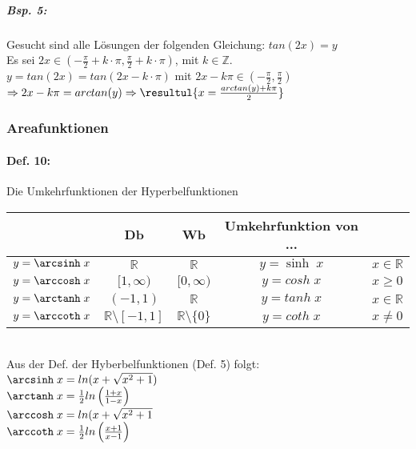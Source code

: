 \subparagraph{Bsp. 5:}\parskp
Gesucht sind alle Lösungen der folgenden Gleichung: $tan(2x)=y$\\
Es sei $2x \in \left( -\frac{\pi}{2}+k \cdot \pi, \frac{\pi}{2} + k \cdot \pi\right)$, mit $k \in \mathbb{Z}$.\\
$y=tan(2x)=tan(2x-k\cdot \pi)$ mit $2x-k\pi \in \left(-\frac{\pi}{2}, \frac{\pi}{2}\right)$\\
$\Rightarrow 2x - k \pi = arctan(y) \Rightarrow \resultul{x = \frac{arctan(y)+k\pi}{2}}$

\subsubsection{Areafunktionen}

\paragraph{Def. 10:} \parskp
Die Umkehrfunktionen der Hyperbelfunktionen\\
\begin{tabular}{c | c | c | c l}
 & Db & Wb & Umkehrfunktion von ...\\
\hline
$y=\arcsinh\; x$ & $\mathbb{R}$ & $\mathbb{R}$ & $y=\sinh\;x$ & $ x \in \mathbb{R}$\\
$y=\arccosh\; x $ & $[1,\infty)$ & $[0,\infty)$ & $y=cosh\; x$ & $x\geq 0$\\
$y=\arctanh\; x$ & $(-1,1)$ & $\mathbb{R}$ & $y=tanh \; x $ & $x \in \mathbb{R}$\\
$y=\arccoth\; x $ & $\mathbb{R}\setminus[-1,1]$ & $\mathbb{R}\setminus\{0\}$ & $y=coth\; x$ & $x \not = 0$\\
\end{tabular}\\
Aus der Def. der Hyberbelfunktionen (Def. 5) folgt:\\
$\arcsinh\; x = ln (x+\sqrt{x^2+1})$\\
$\arctanh\; x=\frac{1}{2}ln\left(\frac{1+x}{1-x}\right)$\\
$\arccosh\; x = ln (x+\sqrt{x^2+1}$\\
$\arccoth\; x = \frac{1}{2}ln\left(\frac{x+1}{x-1}\right)$